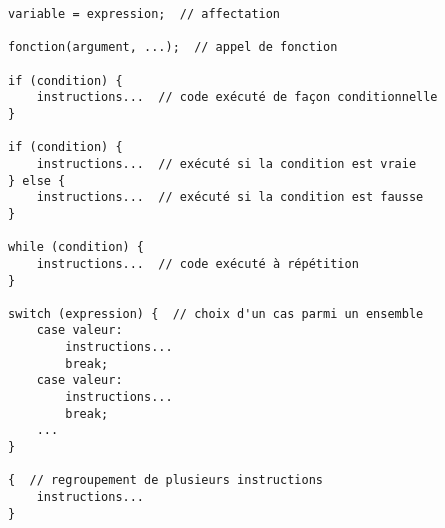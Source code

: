 \documentclass{article}
\begin{document}
\begin{verbatim}
variable = expression;  // affectation

fonction(argument, ...);  // appel de fonction

if (condition) {
    instructions...  // code exécuté de façon conditionnelle
}

if (condition) {
    instructions...  // exécuté si la condition est vraie
} else {
    instructions...  // exécuté si la condition est fausse
}

while (condition) {
    instructions...  // code exécuté à répétition
}

switch (expression) {  // choix d'un cas parmi un ensemble
    case valeur:
        instructions...
        break;
    case valeur:
        instructions...
        break;
    ...
}

{  // regroupement de plusieurs instructions
    instructions...
}
\end{verbatim}
\end{document}
